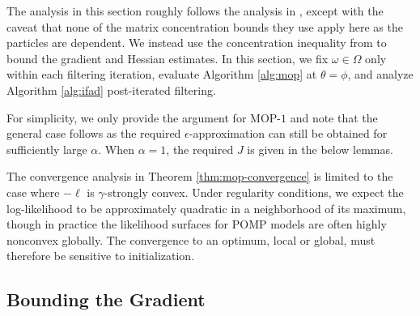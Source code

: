 


The analysis in this section roughly follows the analysis in \cite{mahoney16}, except with the caveat that none of the matrix concentration bounds they use apply here as the particles are dependent. We instead use the concentration inequality from \cite{delMoral11} to bound the gradient and Hessian estimates. In this section, we fix $\omega \in \Omega$ only within each filtering iteration, evaluate Algorithm \ref{alg:mop} at $\theta=\phi$, and analyze Algorithm \ref{alg:ifad} post-iterated filtering.

For simplicity, we only provide the argument for MOP-$1$ and note that the general case follows as the required $\epsilon$-approximation can still be obtained for sufficiently large $\alpha$. 
When $\alpha=1$, the required $J$ is given in the below lemmas. 

The convergence analysis in Theorem \ref{thm:mop-convergence} is limited to the case where $-\ell$ is $\gamma$-strongly convex. Under regularity conditions, we expect the log-likelihood to be approximately quadratic in a neighborhood of its maximum, though in practice the likelihood surfaces for POMP models are often highly nonconvex globally. The convergence to an optimum, local or global, must therefore be sensitive to initialization.  

\subsection{Bounding the Gradient}


